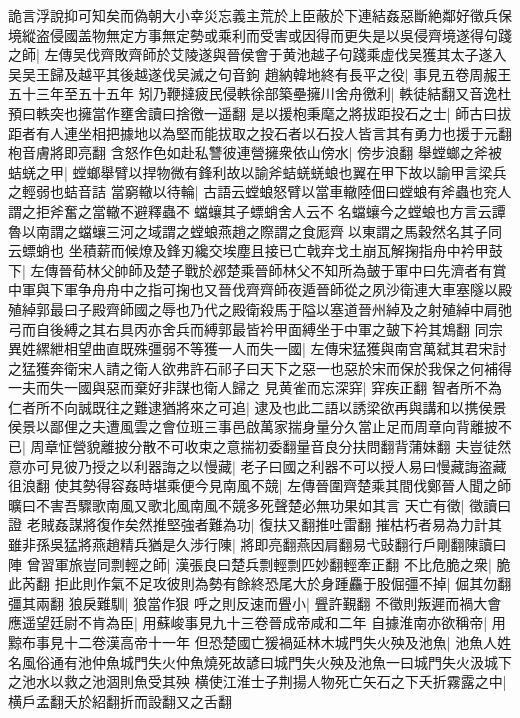 詭言浮說抑可知矣而偽朝大小幸災忘義主荒於上臣蔽於下連結姦惡斷絶鄰好徵兵保境縱盗侵國盖物無定方事無定勢或乘利而受害或因得而更失是以吳侵齊境遂得句踐之師|{
	左傳吴伐齊敗齊師於艾陵遂與晉侯會于黄池越子句踐乘虚伐吴獲其太子遂入吴吴王歸及越平其後越遂伐吴滅之句音鉤}
趙納韓地終有長平之役|{
	事見五卷周赧王五十三年至五十五年}
矧乃鞭撻疲民侵軼徐部築壘擁川舍舟徼利|{
	軼徒結翻又音逸杜預曰軼突也擁當作壅舍讀曰捨徼一遥翻}
是以援枹秉麾之將拔距投石之士|{
	師古曰拔距者有人連坐相把據地以為堅而能拔取之投石者以石投人皆言其有勇力也援于元翻枹音膚將即亮翻}
含怒作色如赴私讐彼連營擁衆依山傍水|{
	傍步浪翻}
舉螳螂之斧被蛣蜣之甲|{
	螳螂舉臂以捍物微有鋒利故以諭斧蛣蜣蜣蜋也翼在甲下故以諭甲言梁兵之輕弱也蛣音詰}
當窮轍以待輪|{
	古語云螳蜋怒臂以當車轍陸佃曰螳蜋有斧蟲也兖人謂之拒斧奮之當轍不避釋蟲不蟷蠰其子螵蛸舍人云不名蟷蠰今之螳蜋也方言云譚魯以南謂之蟷蠰三河之域謂之螳蜋燕趙之際謂之食厖齊以東謂之馬穀然名其子同云螵蛸也}
坐積薪而候燎及鋒刃纔交埃塵且接已亡戟弃戈土崩瓦解掬指舟中衿甲鼓下|{
	左傳晉荀林父帥師及楚子戰於邲楚乘晉師林父不知所為皷于軍中曰先濟者有賞中軍與下軍争舟舟中之指可掬也又晉伐齊齊師夜遁晉師從之夙沙衛連大車塞隧以殿殖綽郭最曰子殿齊師國之辱也乃代之殿衛殺馬于隘以塞道晉州綽及之射殖綽中肩弛弓而自後縛之其右具丙亦舍兵而縛郭最皆衿甲面縛坐于中軍之皷下衿其鴆翻}
同宗異姓縲紲相望曲直既殊彊弱不等獲一人而失一國|{
	左傳宋猛獲與南宫萬弑其君宋討之猛獲奔衛宋人請之衛人欲弗許石祁子曰天下之惡一也惡於宋而保於我保之何補得一夫而失一國與惡而棄好非謀也衛人歸之}
見黄雀而忘深穽|{
	穽疾正翻}
智者所不為仁者所不向誠既往之難逮猶將來之可追|{
	逮及也此二語以誘梁欲再與講和以携侯景}
侯景以鄙俚之夫遭風雲之會位班三事邑啟萬家揣身量分久當止足而周章向背離披不已|{
	周章怔營貌離披分散不可收束之意揣初委翻量音良分扶問翻背蒲妹翻}
夫豈徒然意亦可見彼乃授之以利器誨之以慢藏|{
	老子曰國之利器不可以授人易曰慢藏誨盗藏徂浪翻}
使其勢得容姦時堪乘便今見南風不競|{
	左傳晉圍齊楚乘其間伐鄭晉人聞之師曠曰不害吾驟歌南風又歌北風南風不競多死聲楚必無功果如其言}
天亡有徵|{
	徵讀曰證}
老賊姦謀將復作矣然推堅強者難為功|{
	復扶又翻推吐雷翻}
摧枯朽者易為力計其雖非孫吳猛將燕趙精兵猶是久涉行陳|{
	將即亮翻燕因肩翻易弋䜴翻行戶剛翻陳讀曰陣}
曾習軍旅豈同剽輕之師|{
	漢張良曰楚兵剽輕剽匹妙翻輕牽正翻}
不比危脆之衆|{
	脆此芮翻}
拒此則作氣不足攻彼則為勢有餘終恐尾大於身踵麤于股倔彊不掉|{
	倔其勿翻彊其兩翻}
狼戾難馴|{
	狼當作狠}
呼之則反速而舋小|{
	舋許覲翻}
不徵則叛遲而禍大會應遥望廷尉不肯為臣|{
	用蘇峻事見九十三卷晉成帝咸和二年}
自據淮南亦欲稱帝|{
	用黥布事見十二卷漢高帝十一年}
但恐楚國亡猨禍延林木城門失火殃及池魚|{
	池魚人姓名風俗通有池仲魚城門失火仲魚燒死故諺曰城門失火殃及池魚一曰城門失火汲城下之池水以救之池涸則魚受其殃}
横使江淮士子荆揚人物死亡矢石之下夭折霧露之中|{
	横戶孟翻夭於紹翻折而設翻又之舌翻}

